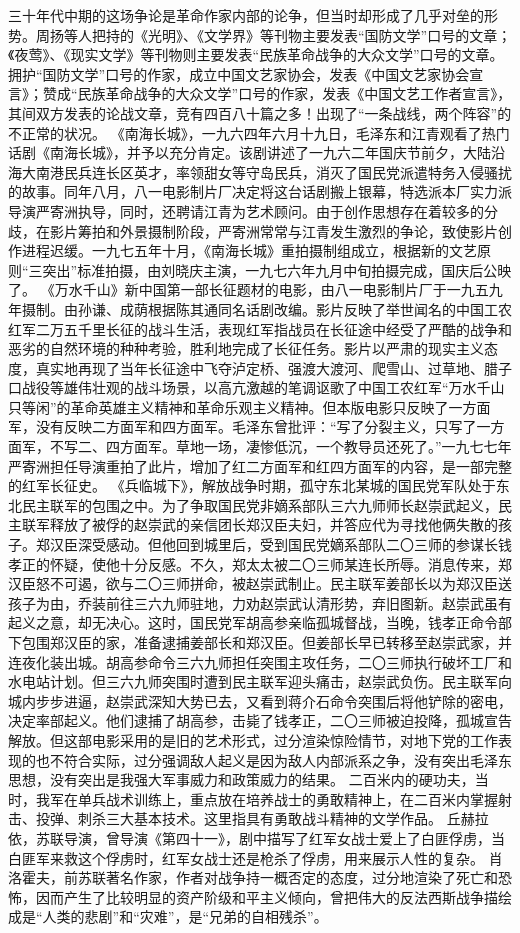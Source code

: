 \begin{maonote}
三十年代中期的这场争论是革命作家内部的论争，但当时却形成了几乎对垒的形势。周扬等人把持的《光明》、《文学界》等刊物主要发表“国防文学”口号的文章；《夜莺》、《现实文学》等刊物则主要发表“民族革命战争的大众文学”口号的文章。拥护“国防文学”口号的作家，成立中国文艺家协会，发表《中国文艺家协会宣言》；赞成“民族革命战争的大众文学”口号的作家，发表《中国文艺工作者宣言》，其间双方发表的论战文章，竞有四百八十篇之多！出现了“一条战线，两个阵容”的不正常的状况。
《南海长城》，一九六四年六月十九日，毛泽东和江青观看了热门话剧《南海长城》，并予以充分肯定。该剧讲述了一九六二年国庆节前夕，大陆沿海大南港民兵连长区英才，率领甜女等守岛民兵，消灭了国民党派遣特务入侵骚扰的故事。同年八月，八一电影制片厂决定将这台话剧搬上银幕，特选派本厂实力派导演严寄洲执导，同时，还聘请江青为艺术顾问。由于创作思想存在着较多的分歧，在影片筹拍和外景摄制阶段，严寄洲常常与江青发生激烈的争论，致使影片创作进程迟缓。一九七五年十月，《南海长城》重拍摄制组成立，根据新的文艺原则“三突出”标准拍摄，由刘晓庆主演，一九七六年九月中旬拍摄完成，国庆后公映了。
《万水千山》新中国第一部长征题材的电影，由八一电影制片厂于一九五九年摄制。由孙谦、成荫根据陈其通同名话剧改编。影片反映了举世闻名的中国工农红军二万五千里长征的战斗生活，表现红军指战员在长征途中经受了严酷的战争和恶劣的自然环境的种种考验，胜利地完成了长征任务。影片以严肃的现实主义态度，真实地再现了当年长征途中飞夺泸定桥、强渡大渡河、爬雪山、过草地、腊子口战役等雄伟壮观的战斗场景，以高亢激越的笔调讴歌了中国工农红军“万水千山只等闲”的革命英雄主义精神和革命乐观主义精神。但本版电影只反映了一方面军，没有反映二方面军和四方面军。毛泽东曾批评：“写了分裂主义，只写了一方面军，不写二、四方面军。草地一场，凄惨低沉，一个教导员还死了。”一九七七年严寄洲担任导演重拍了此片，增加了红二方面军和红四方面军的内容，是一部完整的红军长征史。
《兵临城下》，解放战争时期，孤守东北某城的国民党军队处于东北民主联军的包围之中。为了争取国民党非嫡系部队三六九师师长赵崇武起义，民主联军释放了被俘的赵崇武的亲信团长郑汉臣夫妇，并答应代为寻找他俩失散的孩子。郑汉臣深受感动。但他回到城里后，受到国民党嫡系部队二〇三师的参谋长钱孝正的怀疑，使他十分反感。不久，郑太太被二〇三师某连长所辱。消息传来，郑汉臣怒不可遏，欲与二〇三师拼命，被赵崇武制止。民主联军姜部长以为郑汉臣送孩子为由，乔装前往三六九师驻地，力劝赵崇武认清形势，弃旧图新。赵崇武虽有起义之意，却无决心。这时，国民党军胡高参亲临孤城督战，当晚，钱孝正命令部下包围郑汉臣的家，准备逮捕姜部长和郑汉臣。但姜部长早已转移至赵崇武家，并连夜化装出城。胡高参命令三六九师担任突围主攻任务，二〇三师执行破坏工厂和水电站计划。但三六九师突围时遭到民主联军迎头痛击，赵崇武负伤。民主联军向城内步步进逼，赵崇武深知大势已去，又看到蒋介石命令突围后将他铲除的密电，决定率部起义。他们逮捕了胡高参，击毙了钱孝正，二〇三师被迫投降，孤城宣告解放。但这部电影采用的是旧的艺术形式，过分渲染惊险情节，对地下党的工作表现的也不符合实际，过分强调敌人起义是因为敌人内部派系之争，没有突出毛泽东思想，没有突出是我强大军事威力和政策威力的结果。
二百米内的硬功夫，当时，我军在单兵战术训练上，重点放在培养战士的勇敢精神上，在二百米内掌握射击、投弹、刺杀三大基本技术。这里指具有勇敢战斗精神的文学作品。
丘赫拉依，苏联导演，曾导演《第四十一》，剧中描写了红军女战士爱上了白匪俘虏，当白匪军来救这个俘虏时，红军女战士还是枪杀了俘虏，用来展示人性的复杂。
肖洛霍夫，前苏联著名作家，作者对战争持一概否定的态度，过分地渲染了死亡和恐怖，因而产生了比较明显的资产阶级和平主义倾向，曾把伟大的反法西斯战争描绘成是“人类的悲剧”和“灾难”，是“兄弟的自相残杀”。
\end{maonote}
